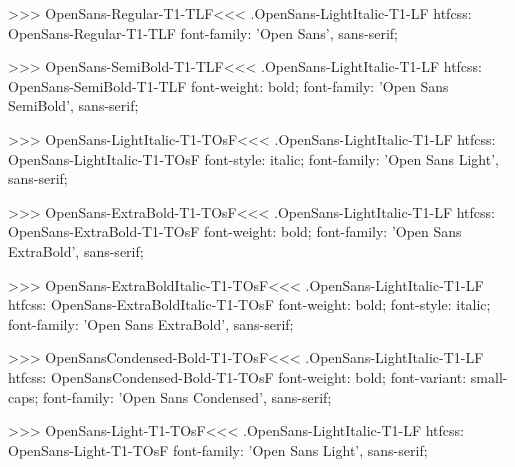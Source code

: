 >>>
\<OpenSans-Regular-T1-TLF\><<<
.OpenSans-LightItalic-T1-LF
htfcss:  OpenSans-Regular-T1-TLF  font-family: 'Open Sans', sans-serif;

>>>
\<OpenSans-SemiBold-T1-TLF\><<<
.OpenSans-LightItalic-T1-LF
htfcss:  OpenSans-SemiBold-T1-TLF  font-weight: bold; font-family: 'Open Sans SemiBold', sans-serif;

>>>
\<OpenSans-LightItalic-T1-TOsF\><<<
.OpenSans-LightItalic-T1-LF
htfcss:  OpenSans-LightItalic-T1-TOsF  font-style: italic; font-family: 'Open Sans Light', sans-serif;

>>>
\<OpenSans-ExtraBold-T1-TOsF\><<<
.OpenSans-LightItalic-T1-LF
htfcss:  OpenSans-ExtraBold-T1-TOsF  font-weight: bold; font-family: 'Open Sans ExtraBold', sans-serif;

>>>
\<OpenSans-ExtraBoldItalic-T1-TOsF\><<<
.OpenSans-LightItalic-T1-LF
htfcss:  OpenSans-ExtraBoldItalic-T1-TOsF  font-weight: bold; font-style: italic; font-family: 'Open Sans ExtraBold', sans-serif;

>>>
\<OpenSansCondensed-Bold-T1-TOsF\><<<
.OpenSans-LightItalic-T1-LF
htfcss:  OpenSansCondensed-Bold-T1-TOsF  font-weight: bold; font-variant: small-caps; font-family: 'Open Sans Condensed', sans-serif;

>>>
\<OpenSans-Light-T1-TOsF\><<<
.OpenSans-LightItalic-T1-LF
htfcss:  OpenSans-Light-T1-TOsF  font-family: 'Open Sans Light', sans-serif;

